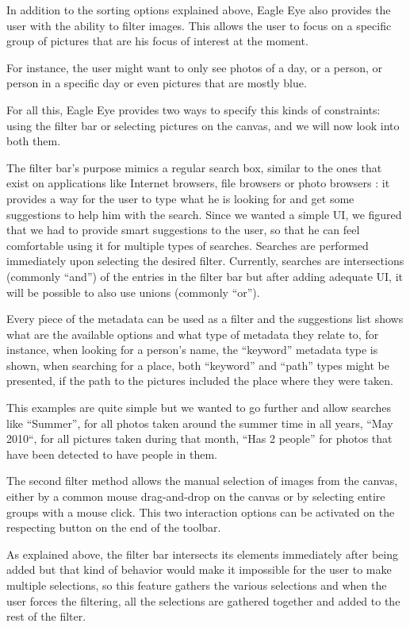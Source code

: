 In addition to the sorting options explained above, Eagle Eye also provides the user with the ability to filter images. This allows the user to focus on a specific group of pictures that are his focus of interest at the moment.

For instance, the user might want to only see photos of a day, or a person, or person in a specific day or even pictures that are mostly blue.

For all this, Eagle Eye provides two ways to specify this kinds of constraints: using the filter bar or selecting pictures on the canvas, and we will now look into both them.

The filter bar's purpose mimics a regular search box, similar to the ones that exist on applications like Internet browsers, file browsers or photo browsers : it provides a way for the user to type what he is looking for and get some suggestions to help him with the search. Since we wanted a simple \ac{UI}, we figured that we had to provide smart suggestions to the user, so that he can feel comfortable using it for multiple types of searches. Searches are performed immediately upon selecting the desired filter. Currently, searches are intersections (commonly ``and'') of the entries in the filter bar but after adding adequate \ac{UI}, it will be possible to also use unions (commonly ``or'').

Every piece of the metadata can be used as a filter and the suggestions list shows what are the available options and what type of metadata they relate to, for instance, when looking for a person's name, the ``keyword'' metadata type is shown, when searching for a place, both ``keyword'' and ``path'' types might be presented, if the path to the pictures included the place where they were taken.

This examples are quite simple but we wanted to go further and allow searches like ``Summer'', for all photos taken around the summer time in all years, ``May 2010``, for all pictures taken during that month, ``Has 2 people'' for photos that have been detected to have people in them. 

The second filter method allows the manual selection of images from the canvas, either by a common mouse drag-and-drop on the canvas or by selecting entire groups with a mouse click. This two interaction options can be activated on the respecting button on the end of the toolbar. 

As explained above, the filter bar intersects its elements immediately after being added but that kind of behavior would make it impossible for the user to make multiple selections, so this feature gathers the various selections and when the user forces the filtering, all the selections are gathered together and added to the rest of the filter.

